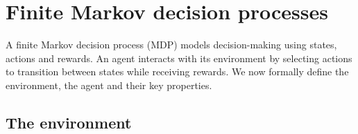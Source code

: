 




\vspace{-0.2cm}

\section{Finite Markov decision processes}

\vspace{-0.2cm}



A finite Markov decision process (MDP) models decision-making using states, actions and rewards.
An agent interacts with its environment by selecting actions to transition between states while receiving rewards.
We now formally define the environment, the agent and their key properties.

\vspace{-0.2cm}

\subsection{The environment}









